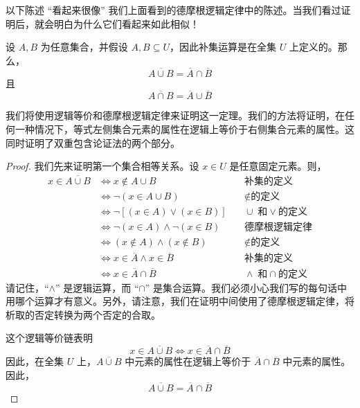 以下陈述 ``看起来很像'' 我们上面看到的德摩根逻辑定律中的陈述。当我们看过证明后，就会明白为什么它们看起来如此相似！

\begin{theorem}\label{theorem4.6.9}
    设 $A, B$ 为任意集合，并假设 $A, B \subseteq U$，因此补集运算是在全集 $U$ 上定义的。那么，
    \[\overline{A \cup B} = \overline{A} \cap \overline{B}\]
    且
    \[\overline{A \cap B} = \overline{A} \cup \overline{B}\]
\end{theorem}

我们将使用逻辑等价和德摩根逻辑定律来证明这一定理。我们的方法将证明，在任何一种情况下，等式左侧集合元素的属性在逻辑上等价于右侧集合元素的属性。这同时证明了双重包含论证法的两个部分。

\begin{proof}
    我们先来证明第一个集合相等关系。设 $x \in U$ 是任意固定元素。则，
    \begin{align*}
        x \in \overline{A \cup B} &\iff x \notin A \cup B &\quad \text{补集的定义}\\
        &\iff \neg(x \in A \cup B) &\quad \notin \text{的定义}\\
        &\iff \neg[(x \in A) \lor (x \in B)] &\quad \cup \;\text{和} \lor \text{的定义}\\
        &\iff \neg(x \in A) \land \neg(x \in B) &\quad \text{德摩根逻辑定律}\\
        &\iff (x \notin A) \land (x \notin B) &\quad \notin \text{的定义}\\
        &\iff x \in \overline{A} \land x \in \overline{B} &\quad \text{补集的定义}\\
        &\iff x \in \overline{A} \cap \overline{B} &\quad \land \;\text{和} \cap \text{的定义}
    \end{align*}
    请记住，``$\land$'' 是逻辑运算，而 ``$\cap$'' 是集合运算。我们必须小心我们写的每句话中用哪个运算才有意义。另外，请注意，我们在证明中间使用了德摩根逻辑定律，将析取的否定转换为两个否定的合取。

    这个逻辑等价链表明
    \[x \in \overline{A \cup B} \iff x \in \overline{A} \cap \overline{B}\]
    因此，在全集 $U$ 上，$\overline{A \cup B}$ 中元素的属性在逻辑上等价于 $\overline{A} \cap \overline{B}$ 中元素的属性。因此，
    \[\overline{A \cup B} = \overline{A} \cap \overline{B}\]


\end{proof}
